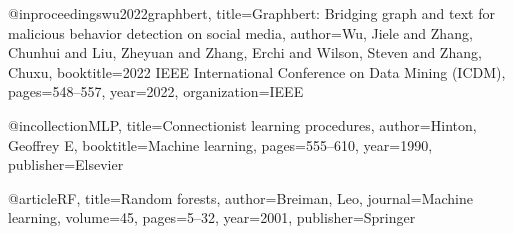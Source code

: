 @inproceedings{wu2022graphbert,
  title={Graphbert: Bridging graph and text for malicious behavior detection on social media},
  author={Wu, Jiele and Zhang, Chunhui and Liu, Zheyuan and Zhang, Erchi and Wilson, Steven and Zhang, Chuxu},
  booktitle={2022 IEEE International Conference on Data Mining (ICDM)},
  pages={548--557},
  year={2022},
  organization={IEEE}
}

@incollection{MLP,
  title={Connectionist learning procedures},
  author={Hinton, Geoffrey E},
  booktitle={Machine learning},
  pages={555--610},
  year={1990},
  publisher={Elsevier}
}

@article{RF,
  title={Random forests},
  author={Breiman, Leo},
  journal={Machine learning},
  volume={45},
  pages={5--32},
  year={2001},
  publisher={Springer}
}